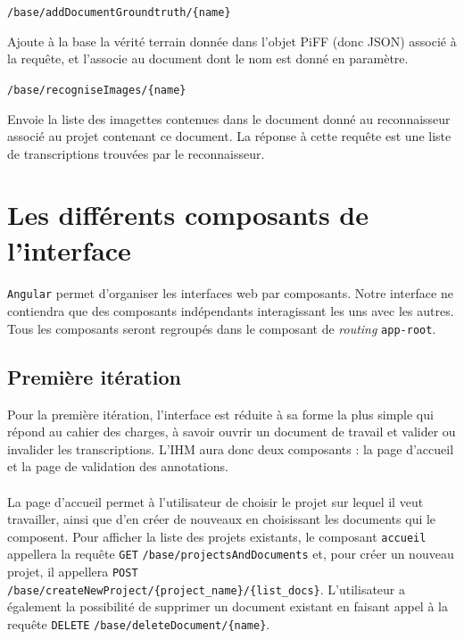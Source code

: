 \begin{description}[align=left]
\item [POST] \texttt{/base/addDocumentGroundtruth/\{name\}}\newline{}
\begin{itshape}
Ajoute à la base la vérité terrain donnée dans l'objet PiFF (donc JSON) associé à la requête, et l'associe au document dont le nom est donné en paramètre.
\end{itshape}

\item [GET] \texttt{/base/recogniseImages/\{name\}}\newline{}
\begin{itshape}
Envoie la liste des imagettes contenues dans le document donné au reconnaisseur associé au projet contenant ce document. La réponse à cette requête est une liste de transcriptions trouvées par le reconnaisseur.
\end{itshape}

\end{description}


\section{Les différents composants de l'interface}

\paragraph{}
\texttt{Angular} permet d'organiser les interfaces web par composants. Notre interface ne contiendra que des composants indépendants interagissant les uns avec les autres. Tous les composants seront regroupés dans le composant de \textit{routing} \texttt{app-root}.

\subsection{Première itération}

Pour la première itération, l’interface est réduite à sa forme la plus simple qui répond au cahier des charges, à savoir ouvrir un document de travail et valider ou invalider les transcriptions. L’IHM aura donc deux composants : la page d’accueil et la page de validation des annotations.

\paragraph{}
La page d’accueil permet à l’utilisateur de choisir le projet sur lequel il veut travailler, ainsi que d'en créer de nouveaux en choisissant les documents qui le composent. Pour afficher la liste des projets existants, le composant \texttt{accueil} appellera la requête \texttt{GET} \texttt{/base/projectsAndDocuments} et, pour créer un nouveau projet, il appellera \texttt{POST} \texttt{/base/createNewProject/\{project\_name\}/\{list\_docs\}}. L'utilisateur a également la possibilité de supprimer un document existant en faisant appel à la requête \texttt{DELETE} \texttt{/base/deleteDocument/\{name\}}.



